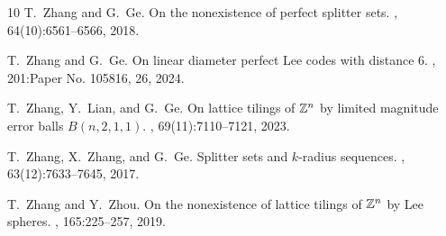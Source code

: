 \documentclass[12pt]{article}
\begin{document}
\begin{thebibliography}{10}
	T.~{Zhang} and G.~{Ge}.
	\newblock On the nonexistence of perfect splitter sets.
	, 64(10):6561--6566, 2018.
	
	T.~Zhang and G.~Ge.
	\newblock On linear diameter perfect {L}ee codes with distance 6.
	, 201:Paper No. 105816, 26, 2024.
	
	T.~Zhang, Y.~Lian, and G.~Ge.
	\newblock On lattice tilings of {$\Bbb Z^n$} by limited magnitude error balls
	{$B(n,2,1,1)$}.
	, 69(11):7110--7121, 2023.
	
	T.~{Zhang}, X.~{Zhang}, and G.~{Ge}.
	\newblock Splitter sets and $k$-radius sequences.
	, 63(12):7633--7645, 2017.
	
	T.~Zhang and Y.~Zhou.
	\newblock On the nonexistence of lattice tilings of {$\Bbb{Z}^n$} by {L}ee
	spheres.
	, 165:225--257, 2019.
	
\end{thebibliography}
\end{document}
